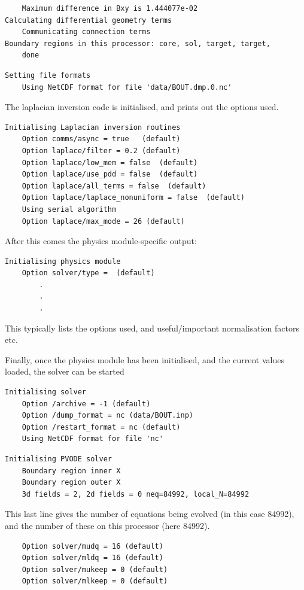 \documentclass[12pt]{article}
\begin{document}
\begin{verbatim}
	Maximum difference in Bxy is 1.444077e-02
Calculating differential geometry terms
	Communicating connection terms
Boundary regions in this processor: core, sol, target, target, 
	done
\end{verbatim}

\begin{verbatim}
Setting file formats
	Using NetCDF format for file 'data/BOUT.dmp.0.nc'
\end{verbatim}

The laplacian inversion code is initialised, and prints out the options used.
\begin{verbatim}
Initialising Laplacian inversion routines
	Option comms/async = true   (default)
	Option laplace/filter = 0.2 (default)
	Option laplace/low_mem = false  (default)
	Option laplace/use_pdd = false  (default)
	Option laplace/all_terms = false  (default)
	Option laplace/laplace_nonuniform = false  (default)
	Using serial algorithm
	Option laplace/max_mode = 26 (default)
\end{verbatim}

After this comes the physics module-specific output:
\begin{verbatim}
Initialising physics module
	Option solver/type =  (default)
        .
        .
        .
\end{verbatim}
This typically lists the options used, and useful/important normalisation factors etc.

Finally, once the physics module has been initialised, 
and the current values loaded, the solver can be started
\begin{verbatim}
Initialising solver
	Option /archive = -1 (default)
	Option /dump_format = nc (data/BOUT.inp)
	Option /restart_format = nc (default)
	Using NetCDF format for file 'nc'
\end{verbatim}

\begin{verbatim}
Initialising PVODE solver
	Boundary region inner X
	Boundary region outer X
	3d fields = 2, 2d fields = 0 neq=84992, local_N=84992
\end{verbatim}
This last line gives the number of equations being evolved (in this case 84992),
and the number of these on this processor (here 84992).
\begin{verbatim}
	Option solver/mudq = 16 (default)
	Option solver/mldq = 16 (default)
	Option solver/mukeep = 0 (default)
	Option solver/mlkeep = 0 (default)
\end{verbatim}
\end{document}
